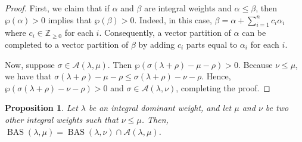 \documentclass{amsart}
\newtheorem{proposition}[theorem]{Proposition}
\theoremstyle{definition}
\DeclareMathOperator{\BAS}{BAS}
\newcommand*{\Z}{\mathbb{Z}}
\begin{document}
\begin{proof}
    First, we claim that if $\alpha$ and $\beta$ are integral weights and $\alpha\leq\beta$, then $\wp(\alpha)>0$ implies that $\wp(\beta)>0$. Indeed, in this case, $\beta=\alpha+\sum_{i=1}^n c_i\alpha_i$ where $c_i\in\Z_{\geq0}$ for each $i$. Consequently, a vector partition of $\alpha$ can be completed to a vector partition of $\beta$ by adding $c_i$ parts equal to $\alpha_i$ for each $i$. 
    
    Now, suppose $\sigma\in\mathcal{A}(\lambda,\mu)$. Then $\wp(\sigma(\lambda+\rho)-\mu-\rho)>0$.
    Because $\nu\leq\mu$, we have that $\sigma(\lambda+\rho)-\mu-\rho\leq \sigma(\lambda+\rho)-\nu-\rho$. Hence, $\wp(\sigma(\lambda+\rho)-\nu-\rho)>0$ and $\sigma\in\mathcal{A}(\lambda,\nu)$, completing the proof.
\end{proof}



\begin{proposition}\label{prop:MovingToLargerWeights}
Let $\lambda$ be an integral dominant weight, and let $\mu$ and $\nu$ be two other integral weights such that $\nu\leq\mu$. 
Then, $\BAS(\lambda,\mu) = \BAS(\lambda,\nu) \cap \mathcal{A}(\lambda,\mu)$. 
\end{proposition}
\end{document}
